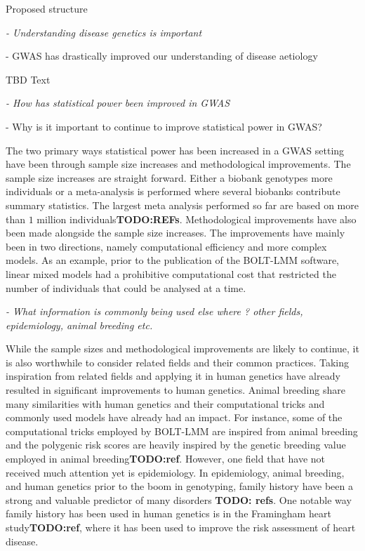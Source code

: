 Proposed structure

{\itshape
- Understanding disease genetics is important

- GWAS has drastically improved our understanding of disease aetiology}

TBD Text



{\itshape
	- How has statistical power been improved in GWAS 
	
	- Why is it important to continue to improve statistical power in GWAS?
}

The two primary ways statistical power has been increased in a GWAS setting have been through sample size increases and methodological improvements. The sample size increases are straight forward. Either a biobank genotypes more individuals or a meta-analysis is performed where several biobanks contribute summary statistics. The largest meta analysis performed so far are based on more than $ 1 $ million individuals\textbf{TODO:REFs}. Methodological improvements have also been made alongside the sample size increases. The improvements have mainly been in two directions, namely computational efficiency and more complex models. As an example, prior to the publication of the BOLT-LMM\cite{loh2015efficient} software, linear mixed models had a prohibitive computational cost that restricted the number of individuals that could be analysed at a time.%

{\itshape
- What information is commonly being used else where ? other fields, epidemiology, animal breeding etc.
}

While the sample sizes and methodological improvements are likely to continue, it is also worthwhile to consider related fields and their common practices. Taking inspiration from related fields and applying it in human genetics have already resulted in significant improvements to human genetics. Animal breeding share many similarities with human genetics and their computational tricks and commonly used models have already had an impact. For instance, some of the computational tricks employed by BOLT-LMM are inspired from animal breeding and the polygenic risk scores are heavily inspired by the genetic breeding value employed in animal breeding\textbf{TODO:ref}. However, one field that have not received much attention yet is epidemiology. In epidemiology, animal breeding, and human genetics prior to the boom in genotyping, family history have been a strong and valuable predictor of many disorders \textbf{TODO: refs}. One notable way family history has been used in human genetics is in the Framingham heart study\textbf{TODO:ref}, where it has been used to improve the risk assessment of heart disease.


